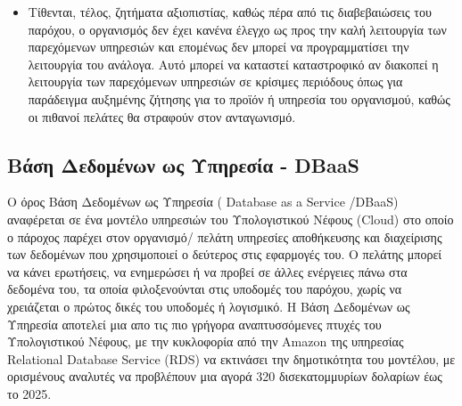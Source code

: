 \documentclass{article}
\begin{document}
\begin{itemize}
\item Τίθενται, τέλος, ζητήματα αξιοπιστίας, καθώς πέρα από τις διαβεβαιώσεις του παρόχου, ο οργανισμός δεν έχει κανένα έλεγχο ως προς την καλή λειτουργία των παρεχόμενων υπηρεσιών και επομένως δεν μπορεί να προγραμματίσει την λειτουργία του ανάλογα. Αυτό μπορεί να καταστεί καταστροφικό αν διακοπεί η λειτουργία των παρεχόμενων υπηρεσιών σε κρίσιμες περιόδους όπως για παράδειγμα αυξημένης ζήτησης για το προϊόν ή υπηρεσία του οργανισμού, καθώς οι πιθανοί πελάτες θα στραφούν στον ανταγωνισμό.
\end{itemize}



\subsection{Βάση Δεδομένων ως Υπηρεσία - DBaaS}
Ο όρος Βάση Δεδομένων ως Υπηρεσία ( Database as a Service /DBaaS) αναφέρεται σε ένα μοντέλο υπηρεσιών του Υπολογιστικού Νέφους (Cloud) στο οποίο ο πάροχος παρέχει στον οργανισμό/ πελάτη υπηρεσίες αποθήκευσης και διαχείρισης των δεδομένων που χρησιμοποιεί ο δεύτερος στις εφαρμογές του. Ο πελάτης μπορεί να κάνει ερωτήσεις, να ενημερώσει ή να προβεί σε άλλες ενέργειες πάνω στα δεδομένα του, τα οποία φιλοξενούνται στις υποδομές του παρόχου, χωρίς να χρειάζεται ο πρώτος δικές του υποδομές ή λογισμικό. Η Βάση Δεδομένων ως Υπηρεσία αποτελεί μια απο τις πιο γρήγορα αναπτυσσόμενες πτυχές του Υπολογιστικού Νέφους, με την κυκλοφορία από την Amazon της υπηρεσίας Relational Database Service (RDS) να εκτινάσει την δημοτικότητα του μοντέλου, με ορισμένους αναλυτές να προβλέπουν μια αγορά 320 δισεκατομμυρίων δολαρίων έως το 2025.
\end{document}
